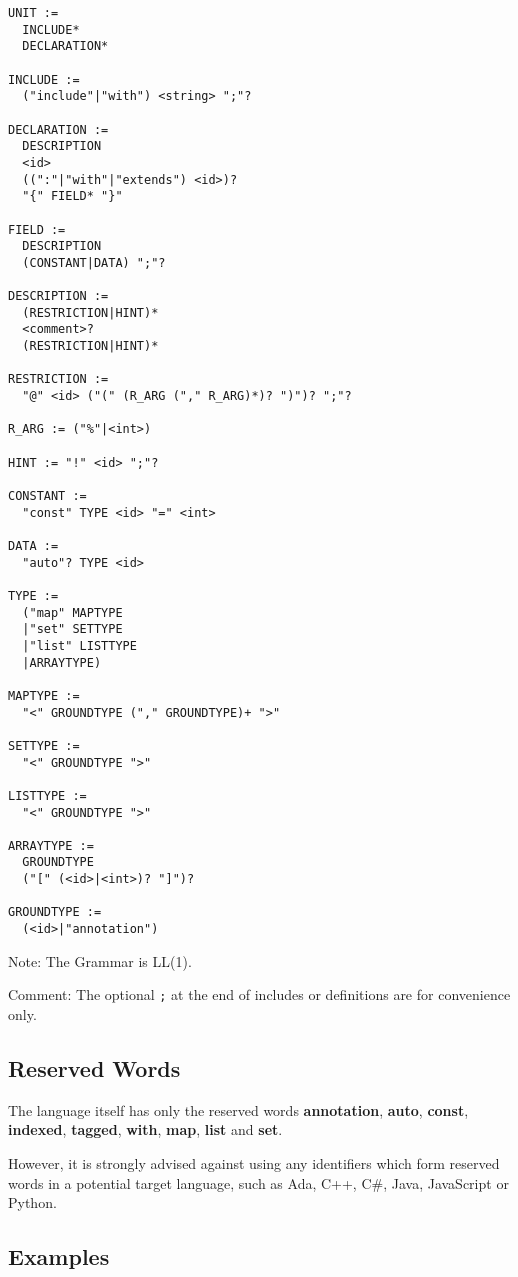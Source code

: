 \documentclass[a4paper,10pt]{article}
\begin{document}
\begin{verbatim}
UNIT :=
  INCLUDE*
  DECLARATION*

INCLUDE := 
  ("include"|"with") <string> ";"?

DECLARATION :=
  DESCRIPTION
  <id>
  ((":"|"with"|"extends") <id>)?
  "{" FIELD* "}"
  
FIELD :=
  DESCRIPTION
  (CONSTANT|DATA) ";"?
  
DESCRIPTION := 
  (RESTRICTION|HINT)*
  <comment>?
  (RESTRICTION|HINT)*
  
RESTRICTION :=
  "@" <id> ("(" (R_ARG ("," R_ARG)*)? ")")? ";"?
  
R_ARG := ("%"|<int>)

HINT := "!" <id> ";"?
  
CONSTANT :=
  "const" TYPE <id> "=" <int>
  
DATA :=
  "auto"? TYPE <id>
  
TYPE :=
  ("map" MAPTYPE
  |"set" SETTYPE
  |"list" LISTTYPE
  |ARRAYTYPE)
  
MAPTYPE :=
  "<" GROUNDTYPE ("," GROUNDTYPE)+ ">"
  
SETTYPE :=
  "<" GROUNDTYPE ">"
  
LISTTYPE :=
  "<" GROUNDTYPE ">"
  
ARRAYTYPE :=
  GROUNDTYPE
  ("[" (<id>|<int>)? "]")?
  
GROUNDTYPE :=
  (<id>|"annotation")

\end{verbatim}
Note: The Grammar is LL(1).

Comment: The optional \texttt{;} at the end of includes or definitions are for convenience only.

\subsection{Reserved Words}

The language itself has only the reserved words \textbf{annotation}, \textbf{auto}, \textbf{const}, \textbf{indexed}, \textbf{tagged}, \textbf{with}, \textbf{map}, \textbf{list} and \textbf{set}.

However, it is strongly advised against using any identifiers which form reserved words in a potential target language, such as Ada, C++, C\#, Java, JavaScript or Python.

\subsection{Examples}
\end{document}
